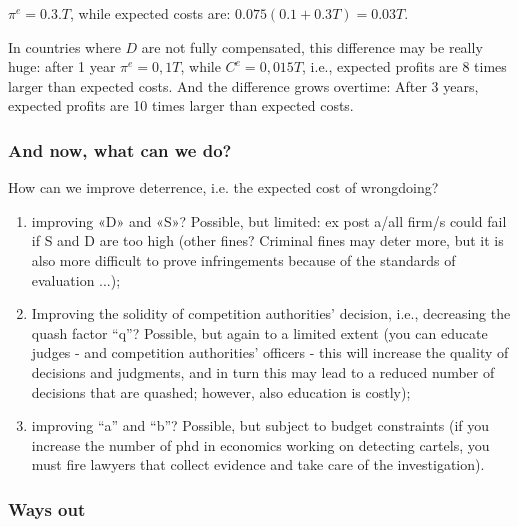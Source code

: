         $\pi^e = 0.3.T$, while expected costs are: $0.075 (0.1+0.3T) = 0.03T$.
        
        In countries where $D$ are not fully compensated, this difference may be really huge: after 1 year $\pi^e = 0,1T$, while $C^e = 0,015 T$, i.e., expected profits are 8 times larger than expected costs. And the difference grows overtime: After 3 years, expected profits are 10 times larger than expected costs.
        
        \subsubsection{And now, what can we do?}

            How can we improve deterrence, i.e. the expected cost of wrongdoing?

            \begin{enumerate}
                \item improving «D» and «S»? Possible, but limited: ex post a/all firm/s could fail if S and D are too high (other fines? Criminal fines may deter more, but it is also more difficult to prove infringements because of the standards of evaluation ...);
                \item Improving the solidity of competition authorities’ decision, i.e., decreasing the quash factor “q”? Possible, but again to a limited extent (you can educate judges - and competition authorities’ officers - this will increase the quality of decisions and judgments, and in turn this may lead to a reduced number of decisions that are quashed; however, also education is costly);
                \item improving “a” and “b”? Possible, but subject to budget constraints (if you increase the number of phd in economics working on detecting cartels, you must fire lawyers that collect evidence and take care of the investigation).
            \end{enumerate}

        \subsubsection{Ways out}

